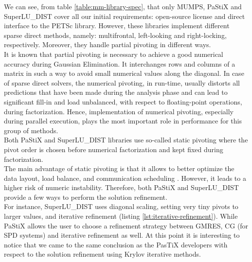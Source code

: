 


We can see, from table \ref{table:mm-library-spec}, that only MUMPS, PaStiX and SuperLU\_DIST cover all our initial requirements: open-source license and direct interface to the PETSc library. However, these libraries implement different sparse direct methods, namely: multifrontal, left-looking and right-locking, respectively. Moreover, they handle partial pivoting in different ways.\\

It is known that partial pivoting is necessary to achieve a good numerical accuracy during Gaussian Elimination. It interchanges rows and columns of a matrix in such a way to avoid small numerical values along the diagonal. In case of sparse direct solvers, the numerical pivoting, in run-time, usually distorts all predictions that have been made during the analysis phase and can lead to significant fill-in and load unbalanced, with respect to floating-point operations, during factorization. Hence, implementation of numerical pivoting, especially during parallel execution, plays the most important role in performance for this group of methods.\\


Both PaStiX and SuperLU\_DIST libraries use so-called static pivoting where the pivot order is chosen before numerical factorization and kept fixed during factorization.\\


The main advantage of static pivoting is that it allows to better optimize the data layout, load balance, and communication scheduling \cite{superlu-manual}. However, it leads to a higher risk of numeric instability. Therefore, both PaStiX and SuperLU\_DIST provide a few ways to perform the solution refinement.\\


For instance, SuperLU\_DIST uses diagonal scaling, setting very tiny pivots to larger values, and iterative refinement (listing \ref{lst:iterative-refinement}). While PaStiX allows the user to choose a refinement strategy between GMRES, CG (for SPD systems) and iterative refinement as well. At this point it is interesting to notice that we came to the same conclusion as the PasTiX developers with respect to the solution refinement using Krylov iterative methods.\\


